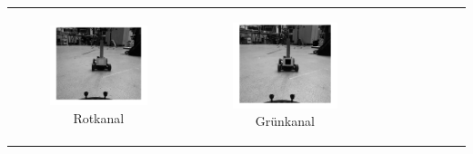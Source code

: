 \begin{center}
\begin{table}[ht]
\begin{tabular}{c c c}
\begin{subfigure}{0.3\textwidth}\centering

\includegraphics[scale=0.08]{rotkanal.png} \vspace{-3.5mm}\caption{Rotkanal}
\end{subfigure}&\begin{subfigure}{0.3\textwidth}\centering

\includegraphics[scale=0.08]{gruenkanal.png} \vspace{-3.5mm}\caption{Grünkanal}
\end{subfigure}&\begin{subfigure}{0.3\textwidth}\centering


\end{subfigure}
\end{tabular}
\end{table}
\end{center}
